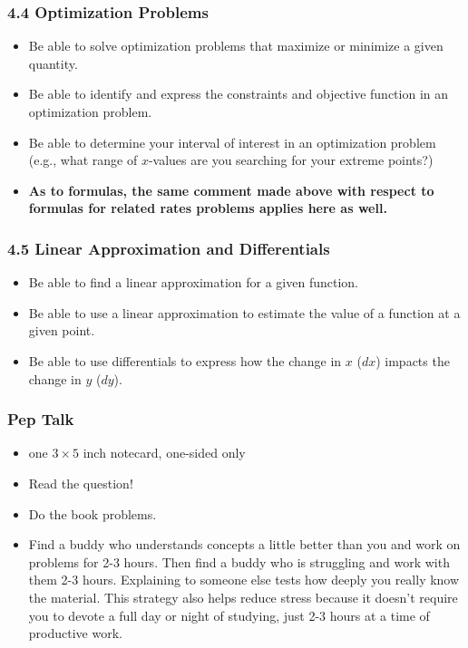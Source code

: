 \documentclass[14pt]{beamer}
\begin{document}
\begin{frame}
\frametitle{\small 4.4 Optimization Problems}
\small
\begin{itemize}
\item Be able to solve optimization problems that maximize or minimize a given quantity.
\item Be able to identify and express the constraints and objective function in an optimization problem.
\item Be able to determine your interval of interest in an optimization problem (e.g., what range of $x$-values are you searching for your extreme points?)
\item {\bf As to formulas, the same comment made above with respect to formulas for related rates problems applies here as well.}
\end{itemize}
\end{frame}

\begin{frame}
\frametitle{\small 4.5 Linear Approximation and Differentials}
\small
\begin{itemize}
\item Be able to find a linear approximation for a given function.
\item Be able to use a linear approximation to estimate the value of a function at a given point.
\item Be able to use differentials to express how the change in $x$ ($dx$) impacts the change in $y$ ($dy$).
\end{itemize}
\end{frame}


\begin{frame}
\frametitle{Pep Talk}
\footnotesize
\begin{itemize}
\item one $3\times 5$ inch notecard, one-sided only
\item Read the question!  
\item Do the book problems.
\item Find a buddy who understands concepts a little better than you and work on problems for 2-3 hours.  Then find a buddy who is struggling and work with them 2-3 hours.  Explaining to someone else tests how deeply you really know the material.  This strategy also helps reduce stress because it doesn't require you to devote a full day or night of studying, just 2-3 hours at a time of productive work.
\end{itemize}
\end{frame}
\end{document}
